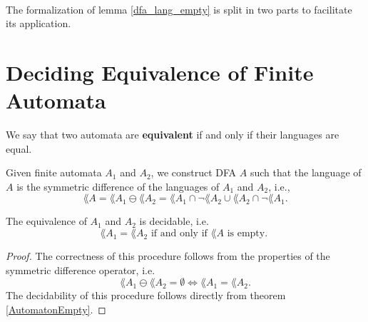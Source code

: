 \paragraph{}
The formalization of lemma \ref{dfa_lang_empty} is split in two parts to facilitate its application. 




\section{Deciding Equivalence of Finite Automata}
\begin{definition}
    We say that two automata are \textbf{equivalent} if and only if their languages are equal.
\end{definition}
Given finite automata $A_1$ and $A_2$, we construct DFA $A$ such that the language of $A$ is the symmetric difference of the languages of $A_1$ and $A_2$, i.e.,
\begin{equation*}          
    \lang{A} = \lang{A_1} \ominus \lang{A_2} = \lang{A_1} \cap \neg \lang{A_2} \cup \lang{A_2} \cap \neg \lang{A_1}.      
\end{equation*}
\begin{theorem} The equivalence of $A_1$ and $A_2$ is decidable, i.e.
    \label{dfa_sym_diff_correct}
    \begin{equation*}                
        \lang{A_1} = \lang{A_2} \mbox{ if and only if } \lang{A} \mbox{ is empty. }                
    \end{equation*}
\end{theorem}
\begin{proof}
    The correctness of this procedure follows from the properties of the symmetric difference operator, i.e.
    \begin{equation*}                  
        \lang{A_1} \ominus \lang{A_2} = \emptyset \Leftrightarrow \lang{A_1} = \lang{A_2}.                  
    \end{equation*}
    The decidability of this procedure follows directly from theorem \ref{AutomatonEmpty}.
\end{proof}


